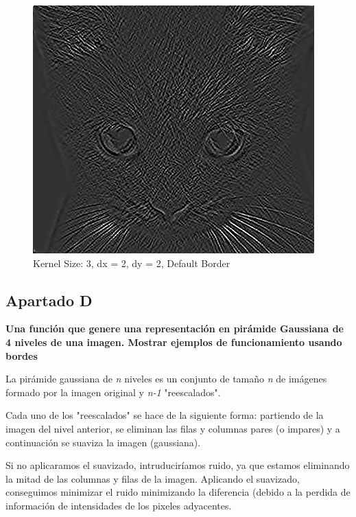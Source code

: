 \documentclass{article}
\begin{document}
\begin{minipage}{\linewidth}
    \centering
    \begin{minipage}{0.45\linewidth}
        \begin{figure}[H]
			\includegraphics[width=\linewidth]{Ejercicio2c/cat(3,2,2)_DEFAULT.png}             			
			\caption{Kernel Size: 3, dx = 2, dy = 2,  Default Border}
        \end{figure}
    \end{minipage}   
\end{minipage}

\subsection*{Apartado D}
\textbf{Una función que genere una representación en pirámide Gaussiana de 4 niveles de una imagen. Mostrar ejemplos de funcionamiento usando bordes}

La pirámide gaussiana de \textit{n} niveles es un conjunto de tamaño \textit{n} de imágenes formado por la imagen original y \textit{n-1} "reescalados".

Cada uno de los "reescalados" se hace de la siguiente forma: partiendo de la imagen del nivel anterior, se eliminan las filas y columnas pares (o impares) y a continuación se suaviza la imagen (gaussiana).

Si no aplicaramos el suavizado, intruduciríamos ruido, ya que estamos eliminando la mitad de las columnas y filas de la imagen. Aplicando el suavizado, conseguimos minimizar el ruido minimizando la diferencia (debido a la perdida de información de intensidades de los pixeles adyacentes.
\end{document}
